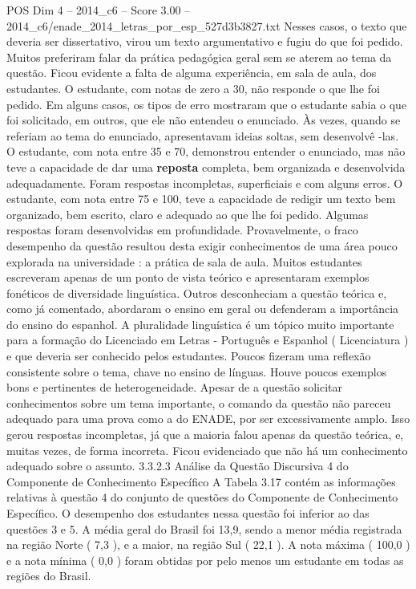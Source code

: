 \begin{textsample}{POS Dim 4 – 2014\_c6 – Score 3.00 – 2014\_c6/enade\_2014\_letras\_por\_esp\_527d3b3827.txt}
Nesses casos, o texto que deveria ser dissertativo, virou um texto argumentativo e fugiu do que foi pedido.
Muitos preferiram falar da prática pedagógica geral sem se aterem ao tema da questão.
Ficou evidente a falta de alguma experiência, em sala de aula, dos estudantes.
O estudante, com notas de zero a 30, não responde o que lhe foi pedido.
Em alguns casos, os tipos de erro mostraram que o estudante sabia o que foi solicitado, em outros, que ele não entendeu o enunciado.
Às vezes, quando se referiam ao tema do enunciado, apresentavam ideias soltas, sem desenvolvê -las.
O estudante, com nota entre 35 e 70, demonstrou entender o enunciado, mas não teve a capacidade de dar uma \textbf{reposta} completa, bem organizada e desenvolvida adequadamente.
Foram respostas incompletas, superficiais e com alguns erros.
O estudante, com nota entre 75 e 100, teve a capacidade de redigir um texto bem organizado, bem escrito, claro e adequado ao que lhe foi pedido.
Algumas respostas foram desenvolvidas em profundidade.
Provavelmente, o fraco desempenho da questão resultou desta exigir conhecimentos de uma área pouco explorada na universidade : a prática de sala de aula.
Muitos estudantes escreveram apenas de um ponto de vista teórico e apresentaram exemplos fonéticos de diversidade linguística.
Outros desconheciam a questão teórica e, como já comentado, abordaram o ensino em geral ou defenderam a importância do ensino do espanhol.
A pluralidade linguística é um tópico muito importante para a formação do Licenciado em Letras - Português e Espanhol ( Licenciatura ) e que deveria ser conhecido pelos estudantes.
Poucos fizeram uma reflexão consistente sobre o tema, chave no ensino de línguas.
Houve poucos exemplos bons e pertinentes de heterogeneidade.
Apesar de a questão solicitar conhecimentos sobre um tema importante, o comando da questão não pareceu adequado para uma prova como a do ENADE, por ser excessivamente amplo.
Isso gerou respostas incompletas, já que a maioria falou apenas da questão teórica, e, muitas vezes, de forma incorreta.
Ficou evidenciado que não há um conhecimento adequado sobre o assunto. 3.3.2.3 Análise da Questão Discursiva 4 do Componente de Conhecimento Específico A Tabela 3.17 contém as informações relativas à questão 4 do conjunto de questões do Componente de Conhecimento Específico.
O desempenho dos estudantes nessa questão foi inferior ao das questões 3 e 5.
A média geral do Brasil foi 13,9, sendo a menor média registrada na região Norte ( 7,3 ), e a maior, na região Sul ( 22,1 ).
A nota máxima ( 100,0 ) e a nota mínima ( 0,0 ) foram obtidas por pelo menos um estudante em todas as regiões do Brasil.

\end{textsample}
